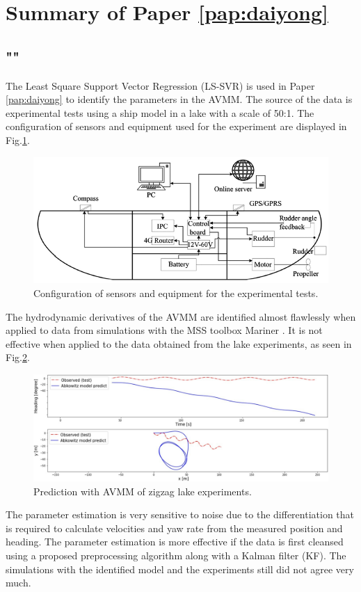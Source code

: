 \section{Summary of Paper \ref{pap:daiyong}}
\subsection*{""}
The Least Square Support Vector Regression (LS-SVR) \cite{brereton_support_2010} is used in Paper \ref{pap:daiyong} to identify the parameters in the AVMM.  
The source of the data is experimental tests using a ship model in a lake with a scale of 50:1. The configuration of sensors and equipment used for the experiment are displayed in Fig.\ref{fig:cthmodel}.  
\begin{figure}[H]
    \centering
    \includegraphics[width=\textwidth]{kappa/images/cth_model.png}
    \caption{Configuration of sensors and equipment for the experimental tests.}
    \label{fig:cthmodel}
\end{figure}
\noindent The hydrodynamic derivatives of the AVMM are identified almost flawlessly when applied to data from simulations with the MSS toolbox Mariner \cite{tristan_matlab_2009}. It is not effective when applied to the data obtained from the lake experiments, as seen in Fig.\ref{fig:daiyong_extrapolation}. 

\begin{figure}[H]
    \centering
    \includegraphics[width=\linewidth]{kappa/images/daiyong_extrapolation.jpeg}
    \caption{Prediction with AVMM of zigzag lake experiments.}
    \label{fig:daiyong_extrapolation}
\end{figure}

\noindent The parameter estimation is very sensitive to noise due to the differentiation that is required to calculate velocities and yaw rate from the measured position and heading. The parameter estimation is more effective if the data is first cleansed using a proposed preprocessing algorithm along with a Kalman filter (KF). The simulations with the identified model and the experiments still did not agree very much.